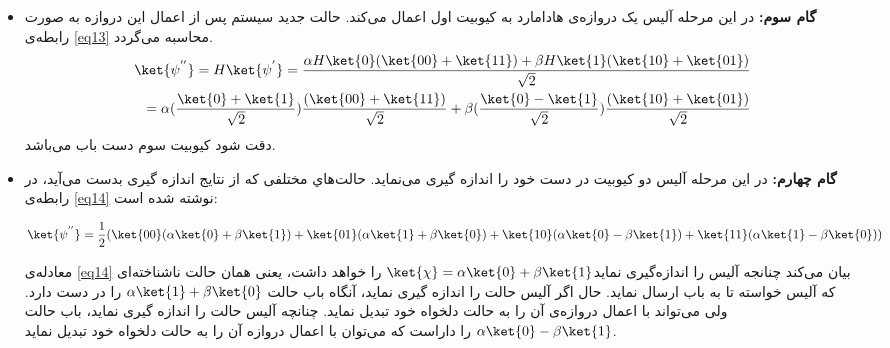 \begin{itemize}
دوکیوبیت اول در این حالت متعلق به آلیس است و سومین کیوبیت (سمت راست‌ترین) متعلق به باب است. بنابراین حالت کوانتومی  بیان‌گر این است که آلیس 01 دارد و باب 1. سپس آلیس با اعمال یک دروازه  امکان می‌دهد که بیت‌های خودش در زوج  که کیوبیت دوم در معادله بالا است، با حالت ناشناخته که اولین کیوبیت در معادله بالاست، برهم کنش داشته باشد. از حالت ناشناخته \ket{\psi} به عنوان بیت کنترل استفاده می‌کند و نتیجه ارائه شده در رابطه‌ی \eqref{eqtt} حاصل می‌شود.
\begin{equation}
\begin{split}
 \ket{\psi^{'}}=U_{CNOT}\ket{\psi} \\
=\frac{\alpha(U_{CNOT}\ket{000}+U_{CNOT}\ket{011})+\beta(U_{CNOT}\ket{100}+U_{CNOT}\ket{111})}{\sqrt{2}} \\
 =\frac{\alpha \ket{000}+\ket{011}+\beta(\ket{110}+\ket{101})}{\sqrt{2}}
\end{split}
\label{eqtt}
\end{equation}
\item
\textbf{ گام سوم: }
در این مرحله آلیس یک دروازه‌ی هادامارد به کیوبیت اول اعمال می‌کند. حالت جدید سیستم پس از اعمال این دروازه به صورت رابطه‌ی \eqref{eq13} محاسبه می‌گردد.
\begin{equation}
\begin{split}
 \ket{\psi^{''}}=H\ket{\psi^{'}}=\frac{\alpha H\ket{0}(\ket{00}+\ket{11})+\beta H\ket{1}(\ket{10}+\ket{01})}{\sqrt{2}} \\
 =\alpha(\frac{\ket{0}+\ket{1}}{\sqrt{2}})\frac{(\ket{00}+\ket{11})}{\sqrt{2}}+\beta(\frac{\ket{0}-\ket{1}}{\sqrt{2}})\frac{(\ket{10}+\ket{01})}{\sqrt{2}}
\end{split}
\label{eq13}
\end{equation}
دقت شود کیوبیت سوم دست باب می‌باشد.

\item
\textbf{گام چهارم:}
در این مرحله آلیس دو کیوبیت در دست خود را اندازه گیری می‌نماید. حالت‌هاي مختلفی که از نتایج اندازه گیری بدست می‌آید، در رابطه‌ی \eqref{eq14} نوشته شده است:

\begin{equation}
\begin{split}
\ket{\psi^{''}}=\frac{1}{2}(\ket{00}(\alpha\ket{0}+\beta\ket{1})+\ket{01}(\alpha\ket{1}+\beta\ket{0})+\ket{10}(\alpha\ket{0}-\beta \ket{1})+\ket{11}(\alpha\ket{1}-\beta\ket{0}))
\end{split}
\label{eq14}
\end{equation}

معادله‌ی \eqref{eq14} بیان می‌کند چنانجه آلیس  را اندازه‌گیری نماید$ \ket{\chi}=\alpha\ket{0}+ \beta\ket{1}$ را خواهد داشت، یعنی همان حالت ناشناخته‌ای که آلیس خواسته تا به باب ارسال نماید. حال اگر آلیس حالت  را اندازه گیری نماید، آنگاه باب حالت
   $\alpha\ket{1}+ \beta\ket{0}$
را در دست دارد. ولی می‌تواند با اعمال دروازه‌ی   آن را به حالت دلخواه خود تبدیل نماید.
چنانچه آلیس حالت  را اندازه گیری نماید، باب حالت $\alpha\ket{0}-\beta\ket{1}$  را داراست که می‌توان با اعمال دروازه  آن را به حالت دلخواه خود تبدیل نماید.


\end{itemize}
